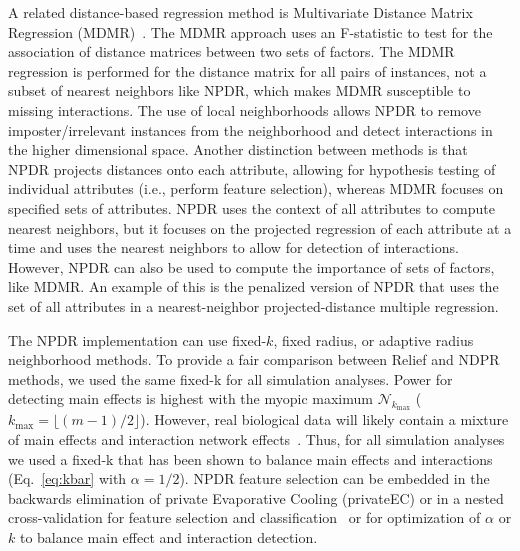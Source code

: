 \documentclass{bioinfo}
\begin{document}
A related distance-based regression method is Multivariate Distance Matrix Regression (MDMR)~\citep{schork12}.
The MDMR approach uses an F-statistic to test for the association of distance matrices between two sets of factors.
The MDMR regression is performed for the distance matrix for all pairs of instances, not a subset of nearest neighbors like NPDR, which makes MDMR susceptible to missing interactions.
The use of local neighborhoods allows NPDR to remove imposter/irrelevant instances from the neighborhood and detect interactions in the higher dimensional space.
Another distinction between methods is that NPDR projects distances onto each attribute, allowing for hypothesis testing of individual attributes (i.e., perform feature selection), whereas MDMR focuses on specified sets of attributes.
NPDR uses the context of all attributes to compute nearest neighbors, but it focuses on the projected regression of each attribute at a time and uses the nearest neighbors to allow for detection of interactions. However, NPDR can also be used to compute the importance of sets of factors, like MDMR.
An example of this is the penalized version of NPDR that uses the set of all attributes in a nearest-neighbor projected-distance multiple regression.

The NPDR implementation can use fixed-$k$, fixed radius, or adaptive radius neighborhood methods. To provide a fair comparison between Relief and NDPR methods, we used the same fixed-k for all simulation analyses.
Power for detecting main effects is highest with the myopic maximum $\mathcal{N}_{k_\text{max}}$ ($k_{\text{max}}=\lfloor (m-1)/2\rfloor$).
However, real biological data will likely contain a mixture of main effects and interaction network effects~\citep{mckinney_pajewski}. Thus, for all simulation analyses we used a fixed-k that has been shown to balance main effects and interactions (Eq.~\ref{eq:kbar} with $\alpha=1/2$)\citep{stir}.
NPDR feature selection can be embedded in the backwards elimination of private Evaporative Cooling (privateEC) or in a nested cross-validation for feature selection and classification~\citep{le17} or for optimization of $\alpha$ or $k$ to balance main effect and interaction detection.
\end{document}
